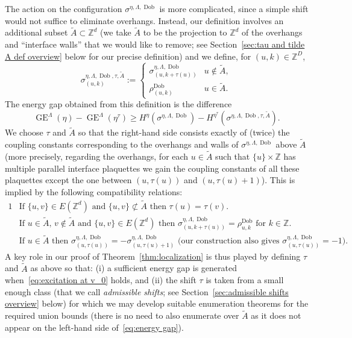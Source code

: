 \documentclass[11pt, reqno]{amsart}
\newcommand{\Z}{\mathbb{Z}}
\DeclareMathOperator{\Dob}{Dob}
\DeclareMathOperator{\GE}{GE}
\numberwithin{equation}{section}
\begin{document}
The action on the configuration $\sigma^{\eta,\Lambda,\Dob}$ is more complicated, since a simple shift would not suffice to eliminate overhangs. Instead, our definition involves an additional subset $\tilde{A}\subset\Z^d$ (we take $\tilde{A}$ to be the projection to $\Z^d$ of the overhangs and ``interface walls'' 
that we would like to remove; see Section~\ref{sec:tau and tilde A def overview} below for our precise definition) and we define, for $(u,k)\in\Z^D$,
\begin{equation}
\sigma^{\eta,\Lambda,\Dob,\tau,\tilde{A}}_{(u,k)}:=\begin{cases}
\sigma^{\eta,\Lambda,\Dob}_{(u,k+\tau(u))}&u\notin\tilde{A},\\
\rho^{\Dob}_{(u,k)}&u\in\tilde{A}.
\end{cases}
\end{equation}
The energy gap obtained from this definition is the difference
\begin{equation}\label{eq:energy gap}
\GE^\Lambda(\eta) - \GE^\Lambda(\eta^\tau) \ge H^{\eta}(\sigma^{\eta,\Lambda,\Dob}) - H^{\eta^\tau}(\sigma^{\eta,\Lambda,\Dob,\tau,\tilde{A}}).
\end{equation}
We choose $\tau$ and $\tilde{A}$ so that the right-hand side consists exactly of (twice) the coupling constants corresponding to the overhangs and walls of $\sigma^{\eta,\Lambda,\Dob}$ above $\tilde{A}$ (more precisely, regarding the overhangs, for each $u\in\tilde{A}$ such that $\{u\}\times\Z$ has multiple parallel interface plaquettes we gain the coupling constants of all these plaquettes except the one between $(u,\tau(u))$ and $(u,\tau(u)+1)$). This is implied by the following compatibility relations:
\begin{alignat}{1}
&\text{If $\{u,v\}\in E(\Z^d)$ and $\{u,v\}\not\subset\tilde{A}$ then $\tau(u)=\tau(v)$.}\\
&\text{If $u\in\tilde{A}$, $v\notin\tilde{A}$ and $\{u,v\}\in E(\Z^d)$ then $\sigma^{\eta,\Lambda,\Dob}_{(u,k+\tau(u))}=\rho^{\Dob}_{u,k}$ for $k\in\Z$.}\\
&\text{If $u\in\tilde{A}$ then $\sigma^{\eta,\Lambda,\Dob}_{(u,\tau(u))}=-\sigma^{\eta,\Lambda,\Dob}_{(u,\tau(u)+1)}$ (our construction also gives $\sigma^{\eta,\Lambda,\Dob}_{(u,\tau(u))}=-1$).}\label{eq:third compatibility relation}
\end{alignat}
A key role in our proof of Theorem~\ref{thm:localization} is thus played by defining $\tau$ and $\tilde{A}$ as above so that: (i) a sufficient energy gap is generated when~\eqref{eq:excitation at v_0} holds, and (ii) the shift $\tau$ is taken from a small enough class (that we call \emph{admissible shifts}; see Section~\ref{sec:admissible shifts overview} below) for which we may develop suitable enumeration theorems for the required union bounds (there is no need to also enumerate over $\tilde{A}$ as it does not appear on the left-hand side of~\eqref{eq:energy gap}).
\end{document}
